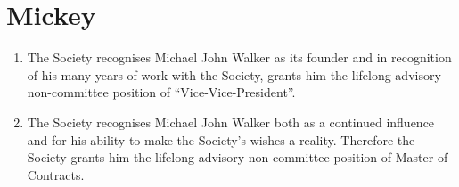\documentclass[a4paper,10pt]{article}
\begin{document}
\section{Mickey}
\begin{enumerate}
  \item The Society recognises Michael John Walker as its founder and in recognition of his many years of work with the Society, grants him the lifelong advisory non-committee position of “Vice-Vice-President”.
  \item The Society recognises Michael John Walker both as a continued influence and for his ability to make the Society's wishes a reality. Therefore the Society grants him the lifelong advisory non-committee position of Master of Contracts.
\end{enumerate}
\end{document}
